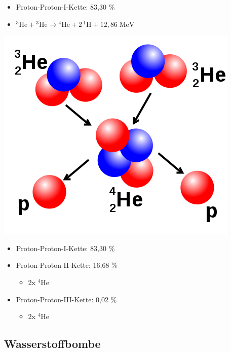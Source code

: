 \documentclass[10pt,a4paper, ngerman]{beamer}
\begin{document}
\begin{frame}{\subsecname}{\secname}
\begin{itemize}
\item Proton-Proton-I-Kette: 83,30 \%
\item \({\displaystyle \mathrm {{}^{3}He+{}^{3}He\to {}^{4}He+2\,{}^{1}H+12{,}86\;MeV} }\)
\end{itemize}
\centering
\includegraphics[height=0.5\textheight]{fids3}
\end{frame}

\begin{frame}{\subsecname}{\secname}
\begin{itemize}
\item Proton-Proton-I-Kette: 83,30 \%
\item Proton-Proton-II-Kette: 16,68 \%
\begin{itemize}
 \item 2x \({\displaystyle \mathrm {{}^{4}He}}\)
\end{itemize}
\item Proton-Proton-III-Kette: 0,02 \%
\begin{itemize}
	\item 2x \({\displaystyle \mathrm {{}^{4}He}}\)
\end{itemize}
\end{itemize}
\end{frame}


\subsection{Wasserstoffbombe}
\begin{frame}{\subsecname}{\secname}

\end{frame}
\end{document}
